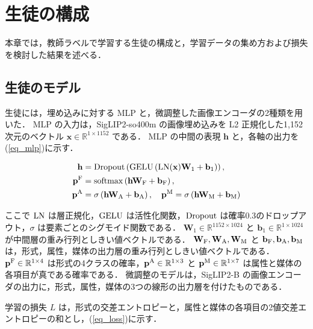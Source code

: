 \section{生徒の構成}
\label{sec_student}
本章では，教師ラベルで学習する生徒の構成と，学習データの集め方および損失を検討した結果を述べる．

\subsection{生徒のモデル}
生徒には，埋め込みに対する MLP と，微調整した画像エンコーダの2種類を用いた．
MLP の入力は，SigLIP2-so400m の画像埋め込みを L2 正規化した1,152次元のベクトル $ {\mathbf x} \in {\mathbb R}^{1 \times 1152} $ である．
MLP の中間の表現 $ {\mathbf h} $ と，各軸の出力を(\ref{eq_mlp})に示す．

\begin{align}
    {\mathbf h} &= {\rm Dropout} \left( {\rm GELU} \left( {\rm LN}({\mathbf x}) {\mathbf W}_1 + {\mathbf b}_1 \right) \right),
    \nonumber \\
    {\mathbf p}^{\rm F} &= {\rm softmax} \left( {\mathbf h} {\mathbf W}_{\rm F} + {\mathbf b}_{\rm F} \right),
    \nonumber \\
    {\mathbf p}^{\rm A} &= \sigma \left( {\mathbf h} {\mathbf W}_{\rm A} + {\mathbf b}_{\rm A} \right),
    \quad
    {\mathbf p}^{\rm M} = \sigma \left( {\mathbf h} {\mathbf W}_{\rm M} + {\mathbf b}_{\rm M} \right)
    \label{eq_mlp}
\end{align}

\noindent
ここで ${\rm LN}$ は層正規化\cite{ref_layernorm}，${\rm GELU}$ は活性化関数\cite{ref_gelu}，${\rm Dropout}$ は確率0.3のドロップアウト\cite{ref_dropout}，$ \sigma $ は要素ごとのシグモイド関数である．
$ {\mathbf W}_1 \in {\mathbb R}^{1152 \times 1024} $ と $ {\mathbf b}_1 \in {\mathbb R}^{1 \times 1024} $ が中間層の重み行列としきい値ベクトルである．
$ {\mathbf W}_{\rm F}, {\mathbf W}_{\rm A}, {\mathbf W}_{\rm M} $ と $ {\mathbf b}_{\rm F}, {\mathbf b}_{\rm A}, {\mathbf b}_{\rm M} $ は，形式，属性，媒体の出力層の重み行列としきい値ベクトルである．
$ {\mathbf p}^{\rm F} \in {\mathbb R}^{1 \times 4} $ は形式の4クラスの確率，$ {\mathbf p}^{\rm A} \in {\mathbb R}^{1 \times 3} $ と $ {\mathbf p}^{\rm M} \in {\mathbb R}^{1 \times 7} $ は属性と媒体の各項目が真である確率である．
微調整のモデルは，SigLIP2-B の画像エンコーダの出力に，形式，属性，媒体の3つの線形の出力層を付けたものである．

学習の損失 $ L $ は，形式の交差エントロピーと，属性と媒体の各項目の2値交差エントロピーの和とし，(\ref{eq_loss})に示す．

